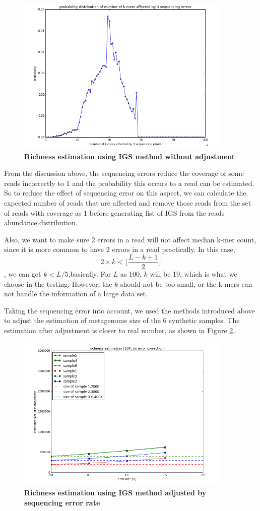\documentclass[12pt]{report}
\begin{document}
\begin{figure}[!ht]
 \centerline{\includegraphics[width=4in]{./figures/IGS_affected_k_kmers.png}}
\caption{\bf Richness estimation using IGS method without adjustment }
\label{fig:IGS_affected_k_kmers}
\end{figure}

From the discussion above, the sequencing errors reduce the coverage of some
reads incorrectly to 1 and the probability this occurs to a read can be
estimated. So to reduce the effect of sequencing error on this aspect, we can
calculate the expected number of reads that are affected and remove those reads
from the set of reads with coverage as 1 before generating list of IGS from the
reads abundance distribution.

Also, we want to make sure 2 errors in a read will not affect median k-mer 
count, since it is more common to have 2 errors in a read practically. 
In this case, 
\[2 \times k < \lfloor \frac{L-k+1}{2}\rfloor \],
we can get $k<L/5$,basically. For $L$ as 100, $k$ will be 19, which is what we 
choose in the testing. However, the $k$ should not be too small, or the k-mers 
can not handle the information of a large data set.

Taking the sequencing error into account, we used the methods introduced above
to adjust the estimation of metagenome size of the 6 synthetic samples. The
estimation after adjustment is closer to real number, as shown in Figure
\ref{fig:IGS_richness_error_adjustment}..


\begin{figure}[!ht]
 \centerline{\includegraphics[width=4in]{./figures/IGS_richness_error_adjustment.png}}
\caption{\bf Richness estimation using IGS method adjusted by sequencing error rate}
\label{fig:IGS_richness_error_adjustment}
\end{figure}
\end{document}
